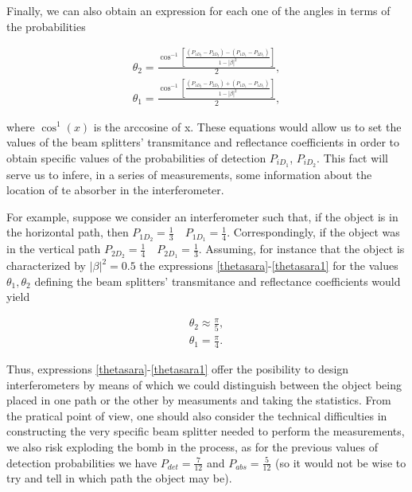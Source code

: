 \documentclass{book}
\begin{document}
Finally, we can also obtain an expression for each one of the angles in terms of the probabilities


\begin{align}
\theta_{2}=\displaystyle \frac{\cos^{-1}\left[\frac{(P_{1D_{2}}-P_{2D_{2}})-(P_{1D_{1}}-P_{2D_{1}})}{1-|\beta|^2}\right]}{2},\label{thetasara}\\
\theta_{1}=\displaystyle \frac{\cos^{-1}\left[\frac{(P_{1D_{2}}-P_{2D_{2}})+(P_{1D_{1}}-P_{1D_{1}})}{1-|\beta|^2}\right]}{2}\label{thetasara1},
\end{align}


where $\cos^{1}(x)$ is the arccosine of x. These equations would allow us  to set the values of the beam splitters' transmitance and reflectance coefficients in order to obtain specific values of the probabilities of detection $P_{iD_{1}}$, $P_{iD_{2}}$. This fact will serve us to infere, in a series of measurements, some information about the location of te absorber in the interferometer.  

For example, suppose we consider an interferometer such that, if the object is in the horizontal path, then $P_{1D_{2}}=\frac{1}{3} \quad P_{1D_{1}}=\frac{1}{4}$. Correspondingly,  if the object was in the vertical path $P_{2D_{2}}=\frac{1}{4} \quad P_{2D_{1}}=\frac{1}{3}$. Assuming, for instance that the object is characterized by $|\beta|^{2}=0.5$ the expressions \ref{thetasara}-\ref{thetasara1} for the values $\theta_{1},\theta_{2}$ defining the beam splitters' transmitance and reflectance coefficients would yield

\begin{align*}
\theta_{2} \approx \frac{\pi}{5},\\
\theta_{1} = \frac{\pi}{4}.
\end{align*}

Thus, expressions \ref{thetasara}-\ref{thetasara1} offer the posibility to design interferometers by means of which we could distinguish between the object being placed in one path or the other by measuments and taking the statistics. From the pratical point of view, one should also consider the technical difficulties in constructing the very specific beam splitter needed to perform the measurements, we also risk exploding the bomb in the process, as for the previous values of detection probabilities we have $P_{det}=\frac{7}{12}$ and $P_{abs}=\frac{5}{12}$ (so it would not be wise to try and tell in which path the object may be).
 

\pagebreak
\end{document}
